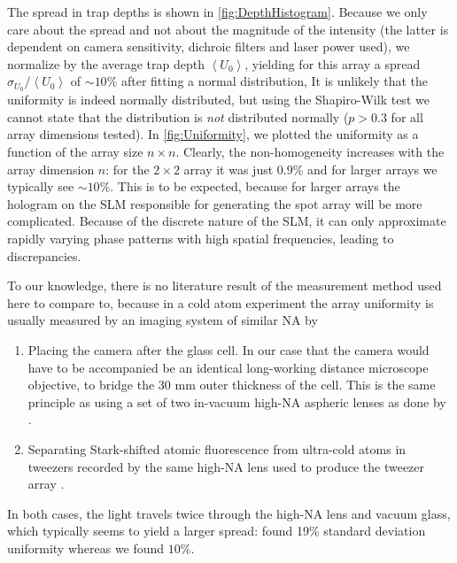 The spread in trap depths is shown in \cref{fig:DepthHistogram}.
Because we only care about the spread and not about the magnitude of the intensity (the latter is dependent on camera sensitivity, dichroic filters and laser power used), we normalize by the average trap depth $\left\langle U_0 \right\rangle$, yielding for this array a spread $\sigma_{U_0} / \left\langle U_0 \right\rangle$ of $\sim10$\% after fitting a normal distribution,
It is unlikely that the uniformity is indeed normally distributed, but using the Shapiro-Wilk test we cannot state that the distribution is \textit{not} distributed normally ($p>0.3$ for all array dimensions tested).
In \cref{fig:Uniformity}, we plotted the uniformity as a function of the array size $n\times n$.
Clearly, the non-homogeneity increases with the array dimension $n$: for the $2\times 2$ array it was just $0.9\%$ and for larger arrays we typically see $\sim 10\%$.
This is to be expected, because for larger arrays the hologram on the SLM responsible for generating the spot array will be more complicated. 
Because of the discrete nature of the SLM, it can only approximate rapidly varying phase patterns with high spatial frequencies, leading to discrepancies. 


To our knowledge, there is no literature result of the measurement method used here to compare to, because in a cold atom experiment the array uniformity is usually measured by an imaging system of similar \ac{NA} by

\begin{enumerate}
    \item Placing the camera after the glass cell. 
    In our case that the camera would have to be accompanied be an identical long-working distance microscope objective, to bridge the 30 mm outer thickness of the cell.
    This is the same principle as using a set of two in-vacuum high-NA aspheric lenses as done by \cite{Nogrette2014}.
    
    \item Separating Stark-shifted atomic fluorescence from ultra-cold atoms in tweezers recorded by the same high-NA lens used to produce the tweezer array \cite{Ebadi2021}.
\end{enumerate}
In both cases, the light travels twice through the high-NA lens and vacuum glass, which typically seems to yield a larger spread: \cite{Nogrette2014} found 19\% standard deviation uniformity whereas we found $10\%$.


